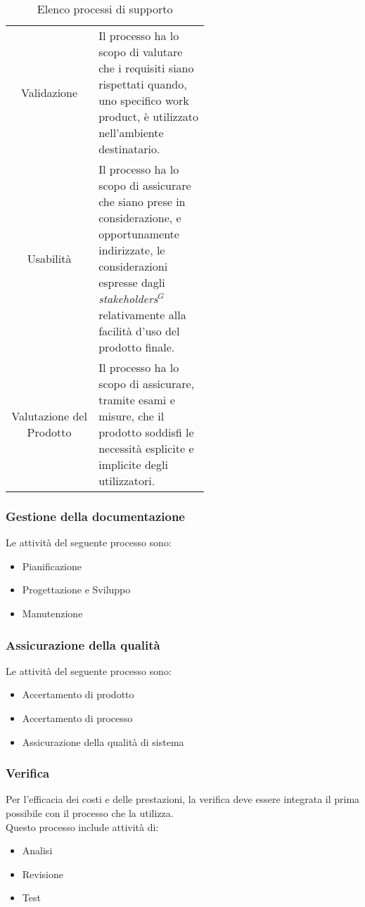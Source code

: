 \begin{table}[h!]
\begin{tabular}{c|p{0.56\linewidth}}
        \rowcolor[RGB]{233, 245, 206}
        Validazione
        & Il processo ha lo scopo di valutare che i requisiti siano rispettati quando,
        uno specifico work product, è utilizzato nell'ambiente destinatario. \\[4pt]
        \rowcolor[RGB]{216, 235, 171}
        Usabilità
        & Il processo ha lo scopo di assicurare che siano prese in considerazione, e opportunamente indirizzate,
        le considerazioni espresse dagli \textit{stakeholders}$^G$ relativamente alla facilità d'uso del prodotto finale. \\[4pt]
        \rowcolor[RGB]{233, 245, 206}
        Valutazione del Prodotto
        & Il processo ha lo scopo di assicurare, tramite esami e misure, che il prodotto soddisfi le necessità esplicite
        e implicite degli utilizzatori.  \\[4pt]
    \end{tabular}
    \caption{Elenco processi di supporto}
\end{table}

\subsubsection{Gestione della documentazione}
Le attività del seguente processo sono:
\begin{itemize}
    \item Pianificazione
    \item Progettazione e Sviluppo
    \item Manutenzione
\end{itemize}

\subsubsection{Assicurazione della qualità}
Le attività del seguente processo sono:
\begin{itemize}
    \item Accertamento di prodotto
    \item Accertamento di processo
    \item Assicurazione della qualità di sistema
\end{itemize}

\subsubsection{Verifica}
Per l'efficacia dei costi e delle prestazioni, la verifica deve essere integrata il prima possibile con il processo
che la utilizza.\\
Questo processo include attività di:
\begin{itemize}
    \item Analisi
    \item Revisione
    \item Test
\end{itemize}

\setlength\extrarowheight{0pt}

